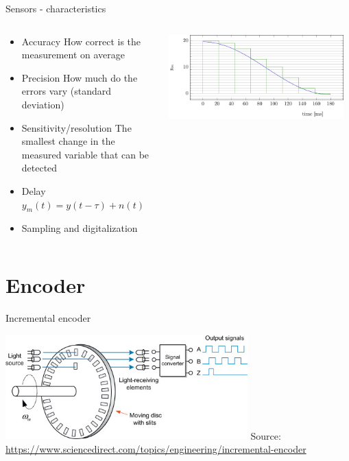 \documentclass[presentation,aspectratio=169]{beamer}
\begin{document}
\begin{frame}[label={sec:org4f846db}]{Sensors - characteristics}
\begin{columns}
\begin{column}{0.4\columnwidth}
\begin{itemize}
\item \alert{Accuracy} How correct is the measurement on average
\item \alert{Precision} How much do the errors vary (standard deviation)
\item \alert{Sensitivity/resolution} The smallest change in the measured variable that can be detected
\item \alert{Delay} \(y_m(t) = y(t-\tau) + n(t)\)
\item \alert{Sampling and digitalization}
\end{itemize}
\end{column}

\begin{column}{0.6\columnwidth}
\pause

\begin{center}
\includegraphics[width=0.96\textwidth]{../../figures/sampling-digitalization}
\end{center}
\end{column}
\end{columns}
\end{frame}

\section{Encoder}
\label{sec:org00031cc}
\begin{frame}[label={sec:org2ea4e7b}]{Incremental encoder}
\begin{center}
\includegraphics[width=0.7\textwidth]{../../figures/encoder-im.jpg}
{\tiny Source: \url{https://www.sciencedirect.com/topics/engineering/incremental-encoder}}
\end{center}
\end{frame}
\end{document}
